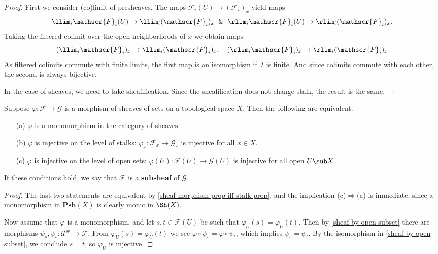 \begin{proof}
First we consider (co)limit of presheaves. The maps $\mathscr{F}_i(U)\to(\mathscr{F}_i)_x$ yield maps \[\llim_i\mathscr{F}_i(U)\to\llim_i(\mathscr{F}_i)_x\And \rlim_i\mathscr{F}_i(U)\to\rlim_i(\mathscr{F}_i)_x.\] 
Taking the filtered colimit over the open neighborhoods of $x$ we obtain maps
\[(\llim_i\mathscr{F}_i)_x\to\llim_i(\mathscr{F}_i)_x,\quad (\rlim_i\mathscr{F}_i)_x\to\rlim_i(\mathscr{F}_i)_x\]
As filtered colimits commute with finite limits, the first map is an isomorphism if $\mathcal{I}$ is finite. And since colimits commute with each other, the second is always bijective.\par
In the case of sheaves, we need to take sheafification. Since the sheafification does not change stalk, the result is the same.
\end{proof}
\begin{proposition}\label{sheaf cat monomorphism iff}
Suppose $\varphi:\mathscr{F}\to\mathscr{G}$ is a morphism of sheaves of sets on a topological space $X$. Then the following are equivalent.
\begin{itemize}
\item[(a)] $\varphi$ is a monomorphism in the category of sheaves.
\item[(b)] $\varphi$ is injective on the level of stalks: $\varphi_x:\mathscr{F}_x\to\mathscr{G}_x$ is injective for all $x\in X$.
\item[(c)] $\varphi$ is injective on the level of open sets: $\varphi(U):\mathscr{F}(U)\to\mathscr{G}(U)$ is injective for all open $U\sub X$.
\end{itemize}
If these conditions hold, we say that $\mathscr{F}$ is a \textbf{subsheaf} of $\mathscr{G}$.
\end{proposition}
\begin{proof}
The last two statements are equivalent by \cref{sheaf morphism prop iff stalk prop}, and the implication (c)$\Rightarrow$(a) is immediate, since a monomorphism in $\mathbf{Psh}(X)$ is clearly monic in $\Sh(X)$.\par 
Now assume that $\varphi$ is a monomorphism, and let $s,t\in\mathscr{F}(U)$ be such that $\varphi_U(s)=\varphi_U(t)$. Then by \cref{sheaf by open subset} there are morphisms $\psi_s,\psi_t:\mathscr{U}^{\#}\to\mathscr{F}$. From $\varphi_U(s)=\varphi_U(t)$ we see $\varphi\circ\psi_s=\varphi\circ\psi_t$, which implies $\psi_s=\psi_t$. By the isomorphism in \cref{sheaf by open subset}, we conclude $s=t$, so $\varphi_U$ is injective.
\end{proof}
